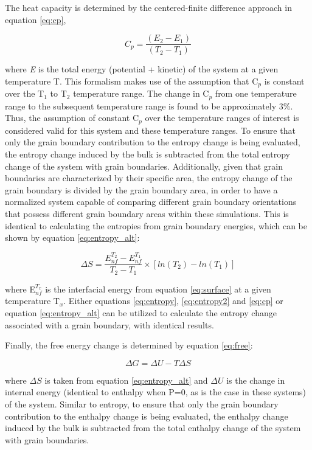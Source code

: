 \documentclass[review]{elsarticle}
\begin{document}
The heat capacity is determined by the centered-finite difference approach in equation \ref{eq:cp},

\begin{equation}
\label{eq:cp}
C_{p} = \frac{(E_{2} - E_{1})}{(T_{2} - T_{1})} 
\end{equation}

where \textit{E} is the total energy (potential + kinetic) of the system at a given temperature T. This formalism makes use of the assumption that C$_{p}$ is constant over the T$_{1}$ to T$_{2}$ temperature range. The change in C$_{p}$ from one temperature range to the subsequent temperature range is found to be approximately 3$\%$. Thus, the assumption of constant C$_{p}$ over the temperature ranges of interest is considered valid for this system and these temperature ranges. To ensure that only the grain boundary contribution to the entropy change is being evaluated, the entropy change induced by the bulk is subtracted from the total entropy change of the system with grain boundaries. Additionally, given that grain boundaries are characterized by their specific area, the entropy change of the grain boundary is divided by the grain boundary area, in order to have a normalized system capable of comparing different grain boundary orientations that possess different grain boundary areas within these simulations. This is identical to calculating the entropies from grain boundary energies, which can be shown by equation \ref{eq:entropy_alt}:

\begin{equation}
\label{eq:entropy_alt}
\Delta S =\frac{ E_{nf}^{T_2} - E_{nf}^{T_1}}{T_2 - T_1} \times [ ln(T_2) - ln(T_1) ]
\end{equation}

where E$_{nf}^{T_{x}}$ is the interfacial energy from equation \ref{eq:surface} at a given temperature T$_x$. Either equations \ref{eq:entropy}, \ref{eq:entropy2} and \ref{eq:cp} or equation \ref{eq:entropy_alt} can be utilized to calculate the entropy change associated with a grain boundary, with identical results. 

Finally, the free energy change is determined by equation \ref{eq:free}:

\begin{equation}
\label{eq:free}
\Delta G = \Delta U - T \Delta S
\end{equation}

where $\Delta S$ is taken from equation \ref{eq:entropy_alt} and $\Delta U$ is the change in internal energy (identical to enthalpy when P=0, as is the case in these systems) of the system. Similar to entropy, to ensure that only the grain boundary contribution to the enthalpy change is being evaluated, the enthalpy change induced by the bulk is subtracted from the total enthalpy change of the system with grain boundaries.
\end{document}
